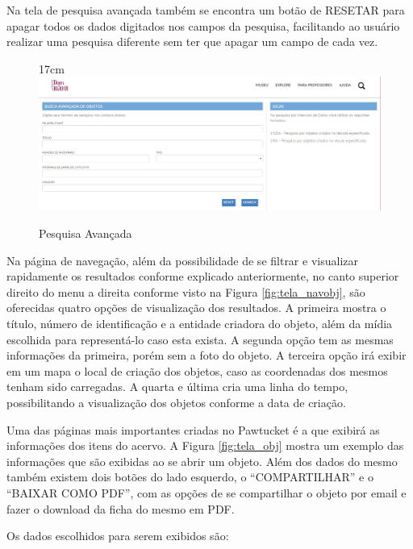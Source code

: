 \documentclass[a4paper,12pt,oneside,onecolumn,final,fleqn]{repUERJ}
\begin{document}
Na tela de pesquisa avançada também se encontra um botão de RESETAR para apagar todos os dados digitados nos campos da pesquisa, facilitando ao usuário realizar uma pesquisa diferente sem ter que apagar um campo de cada vez.

\begin{figure}[!ht]{17cm}
	\includegraphics[width=15cm, center]{figuras/pawtucket_buscaavancada.jpg}
	\caption{Pesquisa Avançada} \label{fig:tela_pesqav}
\end{figure}

Na página de navegação, além da possibilidade de se filtrar e visualizar rapidamente os resultados conforme explicado anteriormente, no canto superior direito do menu a direita conforme visto na Figura \ref{fig:tela_navobj}, são oferecidas quatro opções de visualização dos resultados. A primeira mostra o título, número de identificação e a entidade criadora do objeto, além da mídia escolhida para representá-lo caso esta exista. A segunda opção tem as mesmas informações da primeira, porém sem a foto do objeto. A terceira opção irá exibir em um mapa o local de criação dos objetos, caso as coordenadas dos mesmos tenham sido carregadas. A quarta e última cria uma linha do tempo, possibilitando a visualização dos objetos conforme a data de criação.

Uma das páginas mais importantes criadas no Pawtucket é a que exibirá as informações dos itens do acervo. A Figura \ref{fig:tela_obj} mostra um exemplo das informações que são exibidas ao se abrir um objeto. Além dos dados do mesmo também existem dois botões do lado esquerdo, o ``COMPARTILHAR'' e o ``BAIXAR COMO PDF'', com as opções de se compartilhar o objeto por email e fazer o download da ficha do mesmo em PDF.

Os dados escolhidos para serem exibidos são:
\end{document}
